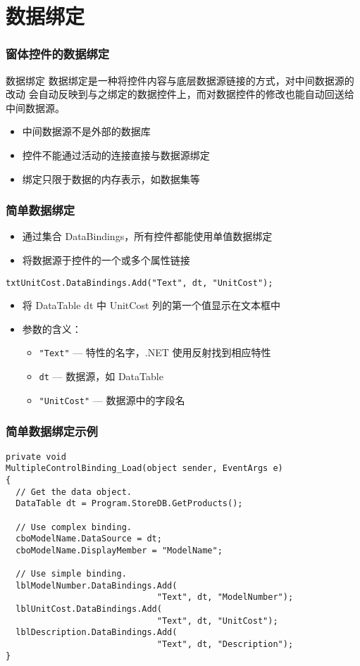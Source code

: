 \section{数据绑定}

\begin{frame}
\frametitle{窗体控件的数据绑定}
\begin{block}{数据绑定}
  \CJKindent 数据绑定是一种将控件内容与底层数据源链接的方式，对中间数据源的改动
  会自动反映到与之绑定的数据控件上，而对数据控件的修改也能自动回送给中间数据源。
\end{block}
\begin{itemize}
\setlength{\itemsep}{8pt plus 1pt}
\item 中间数据源不是外部的数据库
\item 控件不能通过活动的连接直接与数据源绑定
\item 绑定只限于数据的内存表示，如数据集等
\end{itemize}
\end{frame}

\begin{frame}[fragile]
\frametitle{简单数据绑定}
\begin{itemize}
\item 通过集合 DataBindings，所有控件都能使用单值数据绑定
\item 将数据源于控件的一个或多个属性链接
\end{itemize}
\begin{lstlisting}
txtUnitCost.DataBindings.Add("Text", dt, "UnitCost");
\end{lstlisting}
\begin{itemize}
\item 将 DataTable dt 中 UnitCost 列的第一个值显示在文本框中
\item 参数的含义：
\begin{itemize}
  \item \verb|"Text"| --- 特性的名字，.NET 使用反射找到相应特性
  \item \verb|dt| --- 数据源，如 DataTable
  \item \verb|"UnitCost"| --- 数据源中的字段名
  \end{itemize}
\end{itemize}
\end{frame}

\begin{frame}[fragile]
\frametitle{简单数据绑定示例}
\begin{lstlisting}
private void
MultipleControlBinding_Load(object sender, EventArgs e)
{
  // Get the data object.
  DataTable dt = Program.StoreDB.GetProducts();

  // Use complex binding.
  cboModelName.DataSource = dt;
  cboModelName.DisplayMember = "ModelName";

  // Use simple binding.
  lblModelNumber.DataBindings.Add(
                              "Text", dt, "ModelNumber");
  lblUnitCost.DataBindings.Add(
                              "Text", dt, "UnitCost");
  lblDescription.DataBindings.Add(
                              "Text", dt, "Description");
}
\end{lstlisting}
\end{frame}

